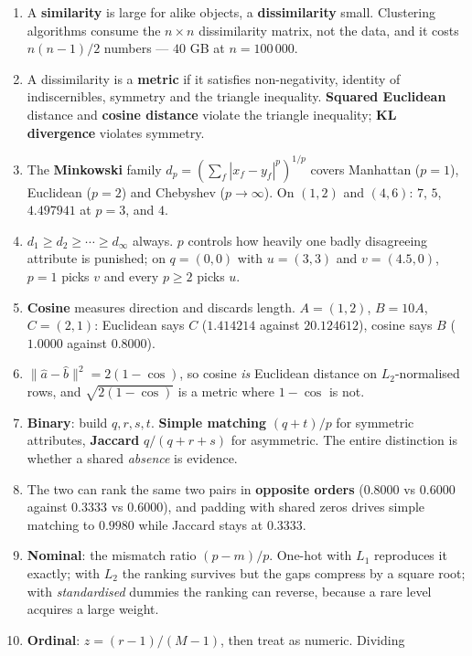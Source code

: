 \documentclass[11pt]{article}
\begin{document}
\begin{enumerate}[leftmargin=*]
  \item A \textbf{similarity} is large for alike objects, a
    \textbf{dissimilarity} small. Clustering algorithms consume the
    $n\times n$ dissimilarity matrix, not the data, and it costs
    $n(n-1)/2$ numbers --- $40$ GB at $n = 100\,000$.
  \item A dissimilarity is a \textbf{metric} if it satisfies non-negativity,
    identity of indiscernibles, symmetry and the triangle inequality.
    \textbf{Squared Euclidean} distance and \textbf{cosine distance} violate
    the triangle inequality; \textbf{KL divergence} violates symmetry.
  \item The \textbf{Minkowski} family $d_p = (\sum_f|x_f-y_f|^p)^{1/p}$
    covers Manhattan ($p{=}1$), Euclidean ($p{=}2$) and Chebyshev
    ($p{\to}\infty$). On $(1,2)$ and $(4,6)$: $7$, $5$, $4.497941$ at
    $p=3$, and $4$.
  \item $d_1 \ge d_2 \ge \cdots \ge d_\infty$ always. $p$ controls how
    heavily one badly disagreeing attribute is punished; on $q=(0,0)$ with
    $u=(3,3)$ and $v=(4.5,0)$, $p=1$ picks $v$ and every $p \ge 2$ picks $u$.
  \item \textbf{Cosine} measures direction and discards length. $A=(1,2)$,
    $B=10A$, $C=(2,1)$: Euclidean says $C$ ($1.414214$ against $20.124612$),
    cosine says $B$ ($1.0000$ against $0.8000$).
  \item $\|\hat a - \hat b\|^2 = 2(1-\cos)$, so cosine \emph{is} Euclidean
    distance on $L_2$-normalised rows, and $\sqrt{2(1-\cos)}$ is a metric
    where $1-\cos$ is not.
  \item \textbf{Binary}: build $q, r, s, t$. \textbf{Simple matching}
    $(q+t)/p$ for symmetric attributes, \textbf{Jaccard} $q/(q+r+s)$ for
    asymmetric. The entire distinction is whether a shared \emph{absence} is
    evidence.
  \item The two can rank the same two pairs in \textbf{opposite orders}
    ($0.8000$ vs $0.6000$ against $0.3333$ vs $0.6000$), and padding with
    shared zeros drives simple matching to $0.9980$ while Jaccard stays at
    $0.3333$.
  \item \textbf{Nominal}: the mismatch ratio $(p-m)/p$. One-hot with $L_1$
    reproduces it exactly; with $L_2$ the ranking survives but the gaps
    compress by a square root; with \emph{standardised} dummies the ranking
    can reverse, because a rare level acquires a large weight.
  \item \textbf{Ordinal}: $z = (r-1)/(M-1)$, then treat as numeric. Dividing

\end{enumerate}
\end{document}
